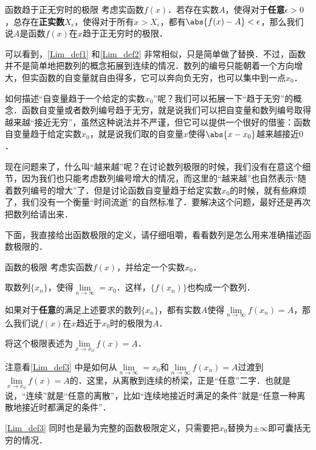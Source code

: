 \begin{definition}{函数趋于正无穷时的极限}\label{Lim_def1}
考虑实函数$f(x)$．若存在实数$A$，使得对于\textbf{任意}$\epsilon>0$，总存在\textbf{正实数}$X_\epsilon$，使得对于所有$x>X_\epsilon$，都有$\abs{f(x)-A}<\epsilon$，那么我们说$A$是函数$f(x)$在$x$趋于正无穷时的极限．
\end{definition}

可以看到，\autoref{Lim_def1} 和\autoref{Lim_def2} 非常相似，只是简单做了替换．不过，函数并不是简单地把数列的概念拓展到连续的情况．数列的编号只能朝着一个方向增大，但实函数的自变量就自由得多，它可以奔向负无穷，也可以集中到一点$x_0$．

如何描述“自变量趋于一个给定的实数$x_0$”呢？我们可以拓展一下“趋于无穷”的概念．函数自变量或者数列编号趋于无穷，就是说我们可以把自变量和数列编号取得越来越“接近无穷”，虽然这种说法并不严谨，但它可以提供一个很好的借鉴：函数自变量趋于给定实数$x_0$，就是说我们取的自变量$x$使得$\abs{x-x_0}$越来越接近$0$．

现在问题来了，什么叫“越来越”呢？在讨论数列极限的时候，我们没有在意这个细节，因为我们也只能考虑数列编号增大的情况，而这里的“越来越”也自然表示“随着数列编号的增大”了．但是讨论函数自变量趋于给定实数$x_0$的时候，就有些麻烦了，我们没有一个衡量“时间流逝”的自然标准了．要解决这个问题，最好还是再次把数列给请出来．

下面，我直接给出函数极限的定义，请仔细咀嚼，看看数列是怎么用来准确描述函数极限的．

\begin{definition}{函数的极限}\label{Lim_def3}
考虑实函数$f(x)$，并给定一个实数$x_0$．

取数列$\{x_n\}$，使得$\lim\limits_{n\to\infty}=x_0$．这样，$\{f(x_n)\}$也构成一个数列．

如果对于\textbf{任意}的满足上述要求的数列$\{x_n\}$，都有实数$A$使得$\lim\limits_{n\to\infty}f(x_n)=A$，那么我们说$f(x)$在$x$趋近于$x_0$时的极限为$A$．

将这个极限表述为$\lim\limits_{x\to x_0}f(x)=A$．
\end{definition}

注意看\autoref{Lim_def3} 中是如何从$\lim\limits_{n\to\infty}=x_0$和$\lim\limits_{n\to\infty}f(x_n)=A$过渡到$\lim\limits_{x\to x_0}f(x)=A$的．这里，从离散到连续的桥梁，正是“任意”二字．也就是说，“连续”就是“任意的离散”，比如“连续地接近时满足的条件”就是“任意一种离散地接近时都满足的条件”．

\autoref{Lim_def3} 同时也是最为完整的函数极限定义，只需要把$x_0$替换为$\pm\infty$即可囊括无穷的情况．


